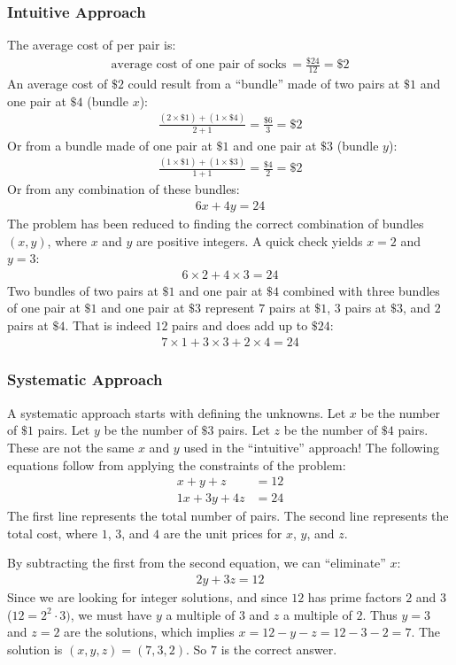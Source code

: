 \documentclass[12pt]{article}
\begin{document}
\subsubsection*{Intuitive Approach}
The average cost of per pair is:
\begin{align*}
\text{average cost of one pair of socks}~ 
  = \frac{\$ 24}{12} 
  = \$ 2
\end{align*}
An average cost of $\$2$ could result from a ``bundle'' made of two pairs at $\$1$ and one pair at $\$4$ (bundle $x$):
\begin{align*}
\frac{(2 \times \$1) + (1 \times \$4)}{2+1} = \frac{\$6}{3}  = \$2
\end{align*}
Or from a bundle made of one pair at $\$1$ and one pair at $\$3$ (bundle $y$):
\begin{align*}
\frac{(1 \times \$1) + (1 \times \$3)}{1+1} = \frac{\$4}{2}  = \$2
\end{align*}
Or from any combination of these bundles:
\begin{align*}
6x + 4y = 24
\end{align*}
The problem has been reduced to finding the correct combination of bundles $(x,y)$, where $x$ and $y$ are positive integers. A quick check yields $x=2$ and $y=3$:
\begin{align*}
6 \times 2 + 4 \times 3 = 24
\end{align*}
Two bundles of two pairs at $\$1$ and one pair at $\$4$ combined with three bundles of one pair at $\$1$ and one pair at $\$3$ represent $7$ pairs at $\$1$, $3$ pairs at $\$3$, and $2$ pairs at $\$4$. That is indeed $12$ pairs and does add up to $\$24$:
\begin{align*}
7 \times 1 + 3 \times 3 + 2 \times 4 = 24
\end{align*}


\subsubsection*{Systematic Approach}
A systematic approach starts with defining the unknowns. Let $x$ be the number of $\$1$ pairs. Let $y$ be the number of $\$3$ pairs. Let $z$ be the number of $\$4$ pairs. These are not the same $x$ and $y$ used in the ``intuitive'' approach! The following equations follow from applying the constraints of the problem:
\begin{align*}
x + y + z & = 12 \\
1x + 3y + 4z & = 24
\end{align*}
The first line represents the total number of pairs. The second line represents the total cost, where $1$, $3$, and $4$ are the unit prices for $x$, $y$, and $z$. 

By subtracting the first from the second equation, we can ``eliminate'' $x$:
\begin{align*}
2y + 3z = 12
\end{align*}
Since we are looking for integer solutions, and since $12$ has prime factors $2$ and $3$ ($12=2^2 \cdot 3)$, we must have $y$ a multiple of $3$ and $z$ a multiple of $2$. Thus $y=3$ and $z=2$ are the solutions, which implies $x=12-y-z=12-3-2=7$. The solution is $(x,y,z)=(7,3,2)$. So $7$ is the correct answer.
\end{document}
